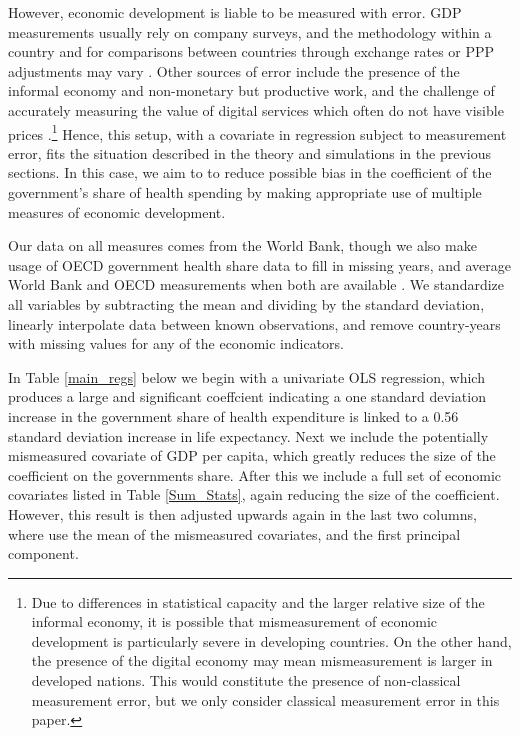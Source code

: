 \documentclass[12pt]{article}
\begin{document}
        However, economic development is liable to be measured with error. GDP measurements usually rely on company surveys, and the methodology within a country and for comparisons between countries through exchange rates or PPP adjustments may vary \citep{grishin_main_2019}. Other sources of error include the presence of the informal economy and non-monetary but productive work, and the challenge of accurately measuring the value of digital services which often do not have visible prices \citep{charmes_informal_2012,ahmad_can_2017}.\footnote{Due to differences in statistical capacity and the larger relative size of the informal economy, it is possible that mismeasurement of economic development is particularly severe in developing countries. On the other hand, the presence of the digital economy may mean mismeasurement is larger in developed nations. This would constitute the presence of non-classical measurement error, but we only consider classical measurement error in this paper.} Hence, this setup, with a covariate in regression subject to measurement error, fits the situation described in the theory and simulations in the previous sections. In this case, we aim to to reduce possible bias in the coefficient of the government's share of health spending by making appropriate use of multiple measures of economic development.

        Our data on all measures comes from the World Bank, though we also make usage of OECD government health share data to fill in missing years, and average World Bank and OECD measurements when both are available \citep{the_world_bank_indicators_2021,oecd_oecd_2021}. We standardize all variables by subtracting the mean and dividing by the standard deviation, linearly interpolate data between known observations, and remove country-years with missing values for any of the economic indicators.

        In Table \ref{main_regs} below we begin with a univariate OLS regression, which produces a large and significant coeffcient indicating a one standard deviation increase in the government share of health expenditure is linked to a 0.56 standard deviation increase in life expectancy. Next we include the potentially mismeasured covariate of GDP per capita, which greatly reduces the size of the coefficient on the governments share. After this we include a full set of economic covariates listed in Table \ref{Sum_Stats}, again reducing the size of the coefficient. However, this result is then adjusted upwards again in the last two columns, where use the mean of the mismeasured covariates, and the first principal component.
\end{document}
